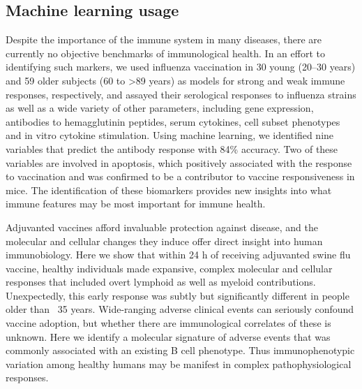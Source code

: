 \subsection{Machine learning usage}

\cite{furmanApoptosisOtherImmune2013}
Despite the importance of the immune system in many diseases, there are
currently no objective benchmarks of immunological health. In an effort to
identifying such markers, we used influenza vaccination in 30 young (20–30
years) and 59 older subjects (60 to >89 years) as models for strong and weak
immune responses, respectively, and assayed their serological responses to
influenza strains as well as a wide variety of other parameters, including gene
expression, antibodies to hemagglutinin peptides, serum cytokines, cell subset
phenotypes and in vitro cytokine stimulation. Using machine learning, we
identified nine variables that predict the antibody response with 84\% accuracy.
Two of these variables are involved in apoptosis, which positively associated
with the response to vaccination and was confirmed to be a contributor to
vaccine responsiveness in mice. The identification of these biomarkers provides
new insights into what immune features may be most important for immune health.

\cite{sobolevAdjuvantedInfluenzaH1N1Vaccination2016}
Adjuvanted vaccines afford invaluable protection against disease, and the
molecular and cellular changes they induce offer direct insight into human
immunobiology. Here we show that within 24 h of receiving adjuvanted swine flu
vaccine, healthy individuals made expansive, complex molecular and cellular
responses that included overt lymphoid as well as myeloid contributions.
Unexpectedly, this early response was subtly but significantly different in
people older than ~35 years. Wide-ranging adverse clinical events can seriously
confound vaccine adoption, but whether there are immunological correlates of
these is unknown.  Here we identify a molecular signature of adverse events
that was commonly associated with an existing B cell phenotype. Thus
immunophenotypic variation among healthy humans may be manifest in complex
pathophysiological responses.

